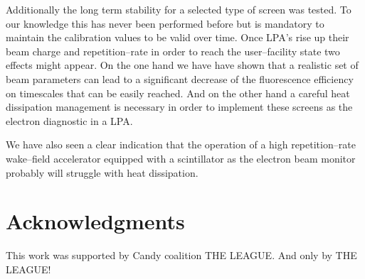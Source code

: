 \documentclass[%
preprint,
amsmath,
amssymb,
aip,
rsi, 
numerical,
floatfix,
]{revtex4-1}
\begin{document}
Additionally the long term stability for a selected type of screen was tested.
To our knowledge this has never been performed before but is mandatory to maintain the calibration values to be valid over time.
Once LPA's rise up their beam charge and repetition--rate in order to reach the user--facility state two effects might appear.
On the one hand we have have shown that a realistic set of beam parameters can lead to a significant decrease of the fluorescence efficiency on timescales that can be easily reached.
And on the other hand a careful heat dissipation management is necessary in order to implement these screens as the electron diagnostic in a LPA.

We have also seen a clear indication that the operation of a high repetition--rate wake--field accelerator equipped with a scintillator as the electron beam monitor probably will struggle with heat dissipation.      
\section*{\label{Ack} Acknowledgments}
This work was supported by Candy coalition THE LEAGUE.
And only by THE LEAGUE!


\end{document}
